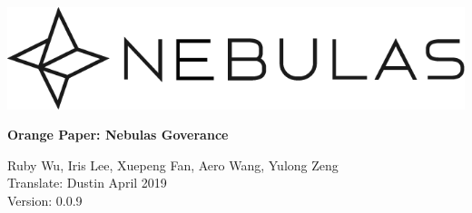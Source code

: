 \documentclass[12pt]{article}
\begin{document}
\pagestyle{empty}

\pagecolor{\pcolor}

\begin{titlepage}
  \begin{center}
    \vspace*{5.5cm}
    \includegraphics[scale=0.5]{../common/Nebulas.png}
    \vspace{0.5cm}


    \textbf{\huge{Orange Paper: Nebulas Goverance}}

    \vspace{0.5cm}
    Ruby Wu, Iris Lee, Xuepeng Fan, Aero Wang, Yulong Zeng\\
    Translate: Dustin
    \vfill
    April 2019\\
    Version: 0.0.9
    \textbf{}
  \end{center}

\end{titlepage}
\setcounter{page}{0}
\tableofcontents
\newpage
\setcounter{page}{1}
\pagestyle{fancy}
\vspace*{0.01cm}





\newpage


\newpage
\begin{appendices}


\end{appendices}
\end{document}
